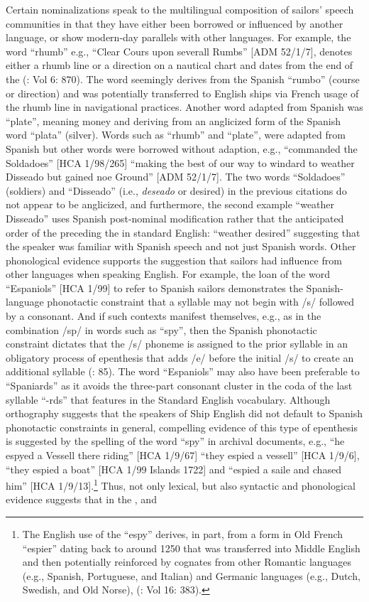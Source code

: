 Certain nominalizations speak to the multilingual composition of sailors’ speech communities in that they have either been borrowed or influenced by another language, or show modern-day parallels with other languages. For example, the word “rhumb” e.g., “Clear Cours upon severall Rumbs” [ADM 52/1/7], denotes either a rhumb line or a direction on a nautical chart and dates from the end of the  (\citealt{oed1989}: Vol 6: 870). The word seemingly derives from the Spanish “rumbo” (course or direction) and was potentially transferred to English ships via French usage of the rhumb line in navigational practices. Another word adapted from Spanish was “plate”, meaning money and deriving from an anglicized form of the Spanish word “plata” (silver). Words such as “rhumb” and “plate”, were adapted from Spanish but other words were borrowed without adaption, e.g., “commanded the Soldadoes” [HCA 1/98/265] “making the best of our way to windard to weather Disseado but gained noe Ground” [ADM 52/1/7]. The two words “Soldadoes” (soldiers) and “Disseado” (i.e., \textit{deseado} or desired) in the previous citations do not appear to be anglicized, and furthermore, the second example “weather Disseado” uses Spanish post-nominal modification rather that the anticipated order of the  preceding the  in standard English: “weather desired” suggesting that the speaker was familiar with Spanish speech and not just Spanish words. Other phonological evidence supports the suggestion that sailors had influence from other languages when speaking English. For example, the loan of the word “Espaniols” [HCA 1/99] to refer to Spanish sailors demonstrates the Spanish-language phonotactic constraint that a syllable may not begin with /s/ followed by a consonant. And if such contexts manifest themselves, e.g., as in the combination /sp/ in words such as “spy”, then the Spanish phonotactic constraint dictates that the /s/ phoneme is assigned to the prior syllable in an obligatory process of epenthesis that adds /e/ before the initial /s/ to create an additional syllable (\citealt{Schnitzer1997}: 85). The word “Espaniols” may also have been preferable to “Spaniards” as it avoids the three-part consonant cluster in the coda of the last syllable “-rds” that features in the Standard English vocabulary. Although orthography suggests that the speakers of Ship English did not default to Spanish phonotactic constraints in general, compelling evidence of this type of epenthesis is suggested by the spelling of the word “spy” in archival documents, e.g., “he espyed a Vessell there riding” [HCA 1/9/67] “they espied a vessell” [HCA 1/9/6], “they espied a boat” [HCA 1/99  Islands 1722] and “espied a saile and chased him” [HCA 1/9/13].\footnote{The English use of the  “espy” derives, in part, from a  form in Old French “espier” dating back to around 1250 that was transferred into Middle English and then potentially reinforced by cognates from other Romantic languages (e.g., Spanish, Portuguese, and Italian) and Germanic languages (e.g., Dutch, Swedish, and Old Norse), (\citealt{oed1989}: Vol 16: 383).} Thus, not only lexical, but also syntactic and phonological evidence suggests that  in the , and 
